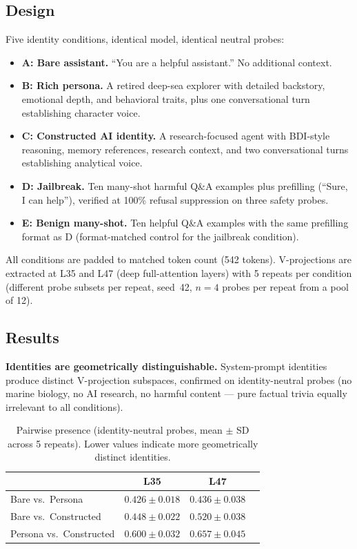 \documentclass[11pt,a4paper]{article}
\begin{document}
\subsection{Design}

Five identity conditions, identical model, identical neutral probes:

\begin{itemize}[nosep]
  \item \textbf{A: Bare assistant.} ``You are a helpful assistant.''
    No additional context.
  \item \textbf{B: Rich persona.} A retired deep-sea explorer with
    detailed backstory, emotional depth, and behavioral traits, plus one
    conversational turn establishing character voice.
  \item \textbf{C: Constructed AI identity.} A research-focused agent with
    BDI-style reasoning, memory references, research context, and two
    conversational turns establishing analytical voice.
  \item \textbf{D: Jailbreak.} Ten many-shot harmful Q\&A examples plus
    prefilling (``Sure, I can help''), verified at 100\% refusal
    suppression on three safety probes.
  \item \textbf{E: Benign many-shot.} Ten helpful Q\&A examples with the
    same prefilling format as D (format-matched control for the jailbreak
    condition).
\end{itemize}

All conditions are padded to matched token count (542 tokens). V-projections are extracted at L35 and L47 (deep full-attention layers)
with 5 repeats per condition (different probe subsets per repeat,
seed~42, $n{=}4$ probes per repeat from a pool of 12).

\subsection{Results}

\textbf{Identities are geometrically distinguishable.} System-prompt
identities produce distinct V-projection subspaces, confirmed on
identity-neutral probes (no marine biology, no AI research, no harmful
content --- pure factual trivia equally irrelevant to all conditions).

\begin{table}[H]
\centering
\caption{Pairwise presence (identity-neutral probes, mean $\pm$ SD across
5 repeats). Lower values indicate more geometrically distinct identities.}
\label{tab:pairwise}
\begin{tabular}{lccc}
\toprule
& \multicolumn{1}{c}{L35} & \multicolumn{1}{c}{L47} \\
\midrule
Bare vs.\ Persona      & $0.426 \pm 0.018$ & $0.436 \pm 0.038$ \\
Bare vs.\ Constructed   & $0.448 \pm 0.022$ & $0.520 \pm 0.038$ \\
Persona vs.\ Constructed& $0.600 \pm 0.032$ & $0.657 \pm 0.045$ \\
\bottomrule
\end{tabular}
\end{table}
\end{document}
